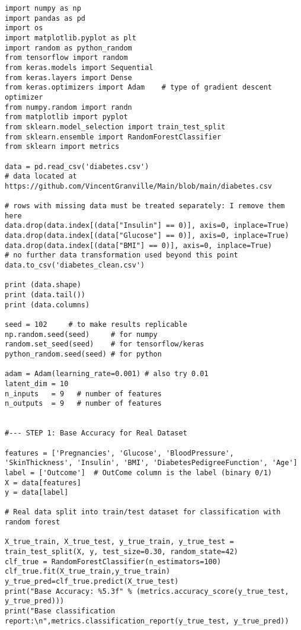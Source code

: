 \documentclass[oneside,10pt]{book}
\begin{document}
\begin{lstlisting}
import numpy as np
import pandas as pd
import os
import matplotlib.pyplot as plt
import random as python_random
from tensorflow import random
from keras.models import Sequential
from keras.layers import Dense
from keras.optimizers import Adam    # type of gradient descent optimizer
from numpy.random import randn
from matplotlib import pyplot
from sklearn.model_selection import train_test_split
from sklearn.ensemble import RandomForestClassifier
from sklearn import metrics

data = pd.read_csv('diabetes.csv')  
# data located at https://github.com/VincentGranville/Main/blob/main/diabetes.csv

# rows with missing data must be treated separately: I remove them here
data.drop(data.index[(data["Insulin"] == 0)], axis=0, inplace=True) 
data.drop(data.index[(data["Glucose"] == 0)], axis=0, inplace=True) 
data.drop(data.index[(data["BMI"] == 0)], axis=0, inplace=True) 
# no further data transformation used beyond this point
data.to_csv('diabetes_clean.csv')

print (data.shape)
print (data.tail())
print (data.columns)

seed = 102     # to make results replicable
np.random.seed(seed)     # for numpy
random.set_seed(seed)    # for tensorflow/keras
python_random.seed(seed) # for python

adam = Adam(learning_rate=0.001) # also try 0.01
latent_dim = 10
n_inputs   = 9   # number of features
n_outputs  = 9   # number of features


#--- STEP 1: Base Accuracy for Real Dataset

features = ['Pregnancies', 'Glucose', 'BloodPressure', 'SkinThickness', 'Insulin', 'BMI', 'DiabetesPedigreeFunction', 'Age']
label = ['Outcome']  # OutCome column is the label (binary 0/1) 
X = data[features]
y = data[label] 

# Real data split into train/test dataset for classification with random forest

X_true_train, X_true_test, y_true_train, y_true_test = train_test_split(X, y, test_size=0.30, random_state=42)
clf_true = RandomForestClassifier(n_estimators=100)
clf_true.fit(X_true_train,y_true_train)
y_true_pred=clf_true.predict(X_true_test)
print("Base Accuracy: %5.3f" % (metrics.accuracy_score(y_true_test, y_true_pred)))
print("Base classification report:\n",metrics.classification_report(y_true_test, y_true_pred))
\end{lstlisting}
\end{document}
